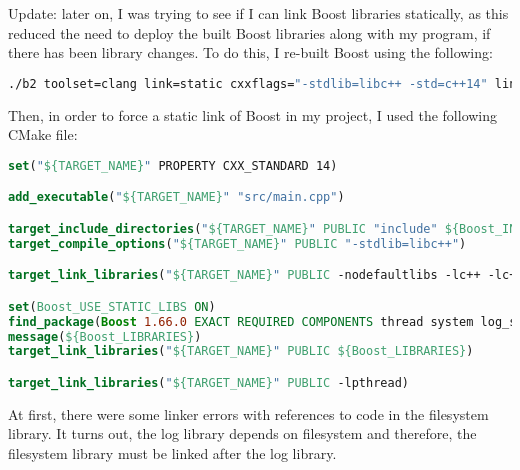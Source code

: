 Update: later on, I was trying to see if I can link Boost libraries statically, as this reduced the need to deploy the built Boost libraries along with my program, if there has been library changes. To do this, I re-built Boost using the following:
\begin{lstlisting}[language=bash]
    ./b2 toolset=clang link=static cxxflags="-stdlib=libc++ -std=c++14" linkflags="-stdlib=libc++" -j 8
\end{lstlisting}

Then, in order to force a static link of Boost in my project, I used the following CMake file:
\begin{lstlisting}[language=CMake]
set("${TARGET_NAME}" PROPERTY CXX_STANDARD 14)

add_executable("${TARGET_NAME}" "src/main.cpp")

target_include_directories("${TARGET_NAME}" PUBLIC "include" ${Boost_INCLUDE_DIRS})
target_compile_options("${TARGET_NAME}" PUBLIC "-stdlib=libc++")

target_link_libraries("${TARGET_NAME}" PUBLIC -nodefaultlibs -lc++ -lc++abi -lc -lm -lgcc_s -lgcc)

set(Boost_USE_STATIC_LIBS ON)
find_package(Boost 1.66.0 EXACT REQUIRED COMPONENTS thread system log_setup log filesystem)
message(${Boost_LIBRARIES})
target_link_libraries("${TARGET_NAME}" PUBLIC ${Boost_LIBRARIES})

target_link_libraries("${TARGET_NAME}" PUBLIC -lpthread)
\end{lstlisting}

At first, there were some linker errors with references to code in the filesystem library. It turns out, the log library depends on filesystem and therefore, the filesystem library must be linked after the log library.
